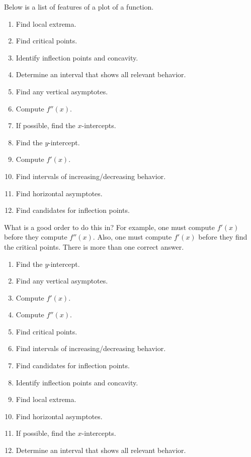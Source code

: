 \documentclass{ximera}
\begin{document}
\begin{problem}%
  Below is a list of features of a plot of a function.
  \begin{enumerate}
  \item Find local extrema.
  \item Find critical points.
  \item Identify inflection points and concavity.
  \item Determine an interval that shows all relevant behavior. \item Find any vertical asymptotes.
  \item Compute $f''(x)$.
  \item If possible, find the $x$-intercepts.
  \item Find the $y$-intercept.
  \item Compute $f'(x)$.
  \item Find intervals of increasing/decreasing behavior.
  \item Find horizontal asymptotes.
  \item Find candidates for inflection points.
 \end{enumerate}
  What is a good order to do this in? For example, one must compute $f'(x)$ before they compute $f''(x)$. Also, one must compute $f'(x)$ before they find the critical points. There is more than one correct answer.
  \begin{freeResponse}
    \begin{enumerate}
  \item Find the $y$-intercept.
  \item Find any vertical asymptotes.
  \item Compute $f'(x)$.
  \item Compute $f''(x)$.
  \item Find critical points.
  \item Find intervals of increasing/decreasing behavior.
  \item Find candidates for inflection points.
  \item Identify inflection points and concavity.
  \item Find local extrema.
  \item Find horizontal asymptotes.
  \item If possible, find the $x$-intercepts.
  \item Determine an interval that shows all relevant behavior. 
  \end{enumerate}
  \end{freeResponse}
\end{problem}



\end{document}
